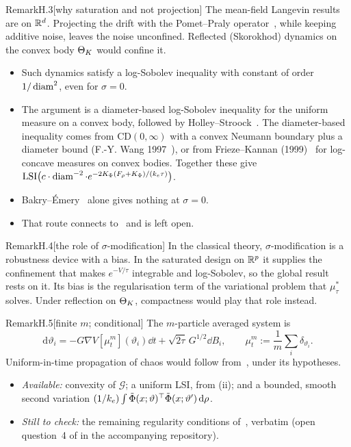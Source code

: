 \begin{rmk}{Remark}{H.3}[why saturation and not projection]
The mean-field Langevin results are on $\mathbb{R}^d$. Projecting the drift with the Pomet--Praly operator~\cite{pp1992},
while keeping additive noise, leaves the noise unconfined. Reflected (Skorokhod) dynamics on the convex body $\Theta_K$
would confine it.
\begin{itemize}
  \item Such dynamics satisfy a log-Sobolev inequality with constant of order $1/\operatorname{diam}^2$, even for $\sigma = 0$.
  \item The argument is a diameter-based log-Sobolev inequality for the uniform measure on a convex body, followed by
  Holley--Stroock~\cite{hs1987}. The diameter-based inequality comes from $\mathrm{CD}(0,\infty)$ with a convex
  Neumann boundary plus a diameter bound (F.-Y. Wang 1997~\cite{wang1997}), or from Frieze--Kannan
  (1999)~\cite{fk1999} for log-concave measures on convex bodies. Together these give
  $\mathrm{LSI}\bigl(c\cdot\operatorname{diam}^{-2}\cdot e^{-2K_\Phi(F_\rho + K_\Phi)/(k_e\tau)}\bigr)$.
  \item Bakry--\'Emery~\cite{be1985} alone gives nothing at $\sigma = 0$.
  \item That route connects to~\cite{R25} and is left open.
\end{itemize}
\end{rmk}

\begin{rmk}{Remark}{H.4}[the role of $\sigma$-modification]
In the classical theory, $\sigma$-modification is a robustness device with a bias. In the saturated design on $\mathbb{R}^p$
it supplies the confinement that makes $e^{-V/\tau}$ integrable and log-Sobolev, so the global result rests on it. Its
bias is the regularisation term of the variational problem that $\mu^*_\tau$ solves. Under reflection on $\Theta_K$,
compactness would play that role instead.
\end{rmk}

\begin{rmk}{Remark}{H.5}[finite $m$; conditional]
The $m$-particle averaged system is
\[
  \mathrm{d}\vartheta_i = -G\nabla V[\mu^m_t](\vartheta_i)\dd t + \sqrt{2\tau}\, G^{1/2}\dd B_i, \qquad
  \mu^m_t := \frac1m\sum_i\delta_{\vartheta_i}.
\]
Uniform-in-time propagation of chaos would follow from~\cite{S5}, under its hypotheses.
\begin{itemize}
  \item \emph{Available:} convexity of $\mathcal{G}$; a uniform LSI, from (ii); and a bounded, smooth second
  variation $(1/k_e)\int\tilde\Phi(x;\vartheta)^\top\tilde\Phi(x;\vartheta')\,\mathrm{d}\rho$.
  \item \emph{Still to check:} the remaining regularity conditions of~\cite{S5}, verbatim (open question~4 of
   in the accompanying repository).
\end{itemize}
\end{rmk}

